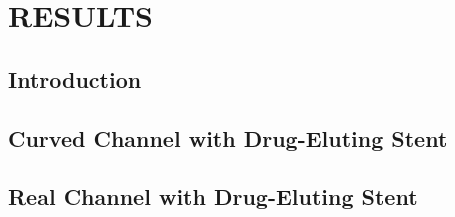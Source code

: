\chapter{\textbf{RESULTS}}
\label{resultados}

\section{\textbf{Introduction}} 


%

\section{\textbf{Curved Channel with Drug-Eluting Stent}} 
\label{canal curvado com stent}


%

\section{\textbf{Real Channel with Drug-Eluting Stent}} 
\label{canal real com stent}


